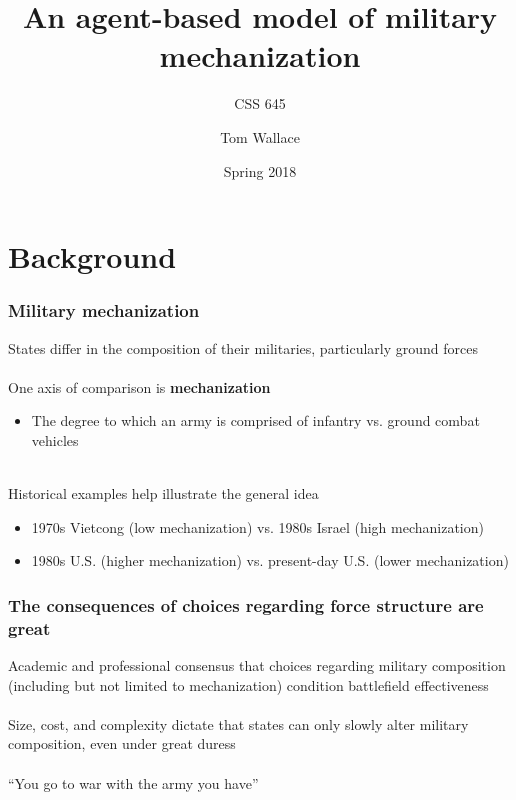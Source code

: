 \documentclass{beamer}
\title{An agent-based model of military mechanization}
\subtitle{CSS 645}
\author{Tom Wallace}
\institute{George Mason University}
\date{Spring 2018}
\begin{document}
\frame{\titlepage}

\section{Background}

\begin{frame}
	\frametitle{Military mechanization}

	States differ in the composition of their militaries, particularly ground forces \\~\\

	One axis of comparison is \textbf{mechanization}
	\begin{itemize}
		\item \small The degree to which an army is comprised of infantry vs. ground combat vehicles \\~\\
	\end{itemize}

	Historical examples help illustrate the general idea
	\begin{itemize}
		\item \small 1970s Vietcong (low mechanization) vs. 1980s Israel (high mechanization)
		\item \small 1980s U.S. (higher mechanization) vs. present-day U.S. (lower mechanization)
	\end{itemize}
\end{frame}

\begin{frame}
	\frametitle{The consequences of choices regarding force structure are great}
	Academic and professional consensus that choices regarding military
	composition (including but not limited to mechanization) condition
	battlefield effectiveness \\~\\

	Size, cost, and complexity dictate that states can only slowly alter 
	military composition, even under great duress \\~\\

	``You go to war with the army you have'' \\~\\
\end{frame}
\end{document}
